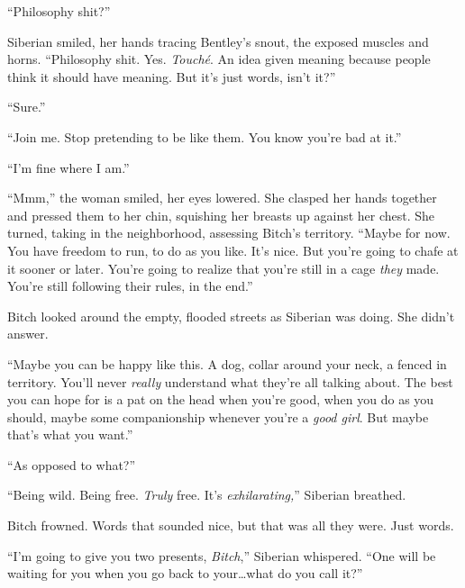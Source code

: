 ``Philosophy shit?''



Siberian smiled, her hands tracing Bentley's snout, the exposed muscles and horns.  ``Philosophy shit.  Yes.  \emph{Touch\'{e}}.  An idea given meaning because people think it should have meaning.  But it's just words, isn't it?''



``Sure.''



``Join me.  Stop pretending to be like them.  You know you're bad at it.''



``I'm fine where I am.''



``Mmm,'' the woman smiled, her eyes lowered.  She clasped her hands together and pressed them to her chin, squishing her breasts up against her chest.  She turned, taking in the neighborhood, assessing Bitch's territory.  ``Maybe for now.  You have freedom to run, to do as you like.  It's nice.  But you're going to chafe at it sooner or later.  You're going to realize that you're still in a cage \emph{they} made.  You're still following their rules, in the end.''



Bitch looked around the empty, flooded streets as Siberian was doing.  She didn't answer.



``Maybe you can be happy like this.  A dog, collar around your neck, a fenced in territory.  You'll never \emph{really} understand what they're all talking about.  The best you can hope for is a pat on the head when you're good, when you do as you should, maybe some companionship whenever you're a \emph{good girl}. But maybe that's what you want.''



``As opposed to what?''



``Being wild.  Being free.  \emph{Truly} free.  It's \emph{exhilarating,}'' Siberian breathed.



Bitch frowned.  Words that sounded nice, but that was all they were.  Just words.



``I'm going to give you two presents, \emph{Bitch},'' Siberian whispered.  ``One will be waiting for you when you go back to your\ldots what do you call it?''




